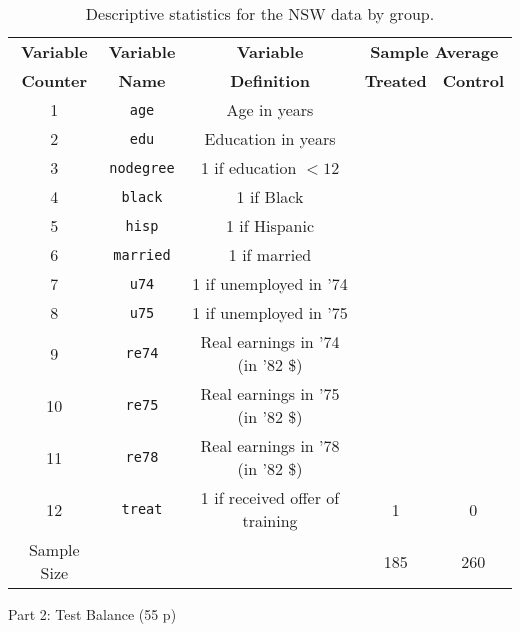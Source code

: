 \documentclass{article}
\begin{document}
\begin{table}[!ht!]
\centering
\begin{tabular}{ccccc}
\hline
\textbf{Variable} & \textbf{Variable}    & \textbf{Variable}    & \multicolumn{2}{c}{\textbf{Sample Average}}    \\ \cline{4-5} 
\textbf{Counter} & \textbf{Name}       & \textbf{Definition}                        & \textbf{Treated} & \textbf{Control} \\ \hline
1 & \texttt{age}      & Age in years                     &             &             \\
2 & \texttt{edu}      & Education in years               &             &            \\
3 & \texttt{nodegree} & 1 if education $<12$             &             &             \\
4 & \texttt{black}    & 1 if Black                       &             &             \\
5 & \texttt{hisp}     & 1 if Hispanic                    &             &             \\
6 & \texttt{married}  & 1 if married                     &             &             \\
7 & \texttt{u74}      & 1 if unemployed in '74           &             &             \\
8 & \texttt{u75}      & 1 if unemployed in '75           &             &             \\
9 & \texttt{re74}     & Real earnings in '74 (in '82 \$) &             &            \\
10 & \texttt{re75}     & Real earnings in '75 (in '82 \$) &             &            \\
\hline
11 & \texttt{re78}     & Real earnings in '78 (in '82 \$) &             &            \\
12 & \texttt{treat}    & 1 if received offer of training  & 1                & 0                \\
\hline
Sample Size                        &                           &       & 185              & 260              \\ \hline
\end{tabular}
\caption{Descriptive statistics for the NSW data by group.}
\label{tab:Tab_NSW_1}
\end{table}
\pagebreak

\begin{center}
{\LARGE Part 2: Test Balance (55 p)}
\end{center}
\end{document}
